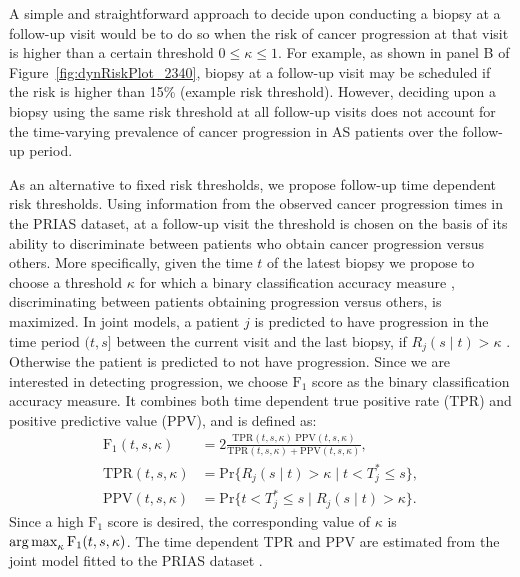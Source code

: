 A simple and straightforward approach to decide upon conducting a biopsy at a follow-up visit would be to do so when the risk of cancer progression at that visit is higher than a certain threshold $0 \leq \kappa \leq 1$. For example, as shown in panel B of Figure~\ref{fig:dynRiskPlot_2340}, biopsy at a follow-up visit may be scheduled if the risk is higher than 15\% (example risk threshold). However, deciding upon a biopsy using the same risk threshold at all follow-up visits does not account for the time-varying prevalence of cancer progression in AS patients over the follow-up period. 

As an alternative to fixed risk thresholds, we propose follow-up time dependent risk thresholds. Using information from the observed cancer progression times in the PRIAS dataset, at a follow-up visit the threshold is chosen on the basis of its ability to discriminate between patients who obtain cancer progression versus others. More specifically, given the time $t$ of the latest biopsy we propose to choose a threshold $\kappa$ for which a binary classification accuracy measure \citep{lopez2014optimalcutpoints}, discriminating between patients obtaining progression versus others, is maximized. In joint models, a patient $j$ is predicted to have progression in the time period $(t, s]$ between the current visit and the last biopsy, if ${R_j(s \mid t) > \kappa}$ \cite{rizopoulosJMbayes, landmarking2017}. Otherwise the patient is predicted to not have progression. Since we are interested in detecting progression, we choose $\mbox{F}_1$ score as the binary classification accuracy measure. It combines both time dependent true positive rate (TPR) and positive predictive value (PPV), and is defined as:
\begin{align*}
\mbox{F}_1(t,  s, \kappa) &= 2\frac{\mbox{TPR}(t,  s, \kappa)\ \mbox{PPV}(t,  s, \kappa)}{\mbox{TPR}(t,  s, \kappa) + \mbox{PPV}(t,  s, \kappa)},\\
\mbox{TPR}(t,  s, \kappa) &= \mbox{Pr}\big\{R_j(s \mid t) > \kappa \mid t < T^*_j \leq s\big\},\\
\mbox{PPV}(t,  s, \kappa) &= \mbox{Pr}\big\{t < T^*_j \leq s \mid R_j(s \mid t) > \kappa \big\}.
\end{align*}
Since a high $\mbox{F}_1$ score is desired, the corresponding value of $\kappa$ is $\operatorname{arg\,max}_{\kappa} \mbox{F}_1(t, s, \kappa)$. The time dependent TPR and PPV are estimated from the joint model fitted to the PRIAS dataset \cite{landmarking2017}.

